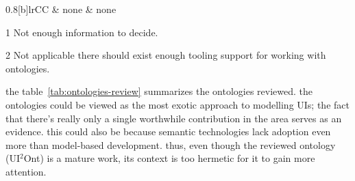 \begin{table}[]
\begin{threeparttable}[b]
\begin{tabularx}{0.8\textwidth}[b]{lrCC}
                        & none                                                    & none                                               \\
                \bottomrule
            \end{tabularx}
            \begin{tablenotes}
                \item [1] Not enough information to decide.
                \item [2] Not applicable\,\textemdash\,there should exist enough tooling support for working with ontologies.
            \end{tablenotes}
        \end{threeparttable}
\end{table}

the table~\ref{tab:ontologies-review} summarizes the ontologies reviewed.
the ontologies could be viewed as the most exotic approach to modelling UIs;
the fact that there's really only a single worthwhile contribution in the area serves as an evidence.
this could also be because semantic technologies lack adoption even more than model-based development.
thus, even though the reviewed ontology (UI$^{2}$Ont) is a mature work, its context is too hermetic for it to gain more attention.
